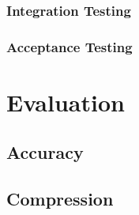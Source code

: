 \documentclass[12pt]{article}
\begin{document}

    \subsubsection{Integration Testing}\label{subsubsec:integration-testing}


    \subsubsection{Acceptance Testing}\label{subsubsec:acceptance-testing}


    \pagebreak


    \section{Evaluation}\label{sec:evaluation}


    \subsection{Accuracy}\label{subsec:accuracy}


    \subsection{Compression}\label{subsec:compression}

\end{document}
